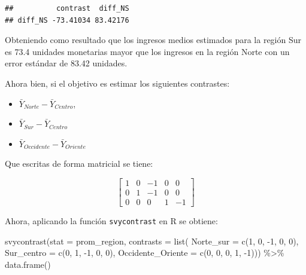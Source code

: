 \documentclass[
  12pt,
]{book}
\newenvironment{Shaded}{\begin{snugshade}}{\end{snugshade}}
\newcommand{\AttributeTok}[1]{\textcolor[rgb]{0.77,0.63,0.00}{#1}}
\newcommand{\DecValTok}[1]{\textcolor[rgb]{0.00,0.00,0.81}{#1}}
\newcommand{\FunctionTok}[1]{\textcolor[rgb]{0.00,0.00,0.00}{#1}}
\newcommand{\NormalTok}[1]{#1}
\newcommand{\SpecialCharTok}[1]{\textcolor[rgb]{0.00,0.00,0.00}{#1}}
\providecommand{\tightlist}{%
  \setlength{\itemsep}{0pt}\setlength{\parskip}{0pt}}
\begin{document}
\begin{verbatim}
##          contrast  diff_NS
## diff_NS -73.41034 83.42176
\end{verbatim}

Obteniendo como resultado que los ingresos medios estimados para la región Sur es 73.4 unidades monetarias mayor que los ingresos en la región Norte con un error estándar de 83.42 unidades.

Ahora bien, si el objetivo es estimar los siguientes contrastes:

\begin{itemize}
\tightlist
\item
  \(\bar{Y}_{Norte} - \bar{Y}_{Centro}\),
\item
  \(\bar{Y}_{Sur}-\bar{Y}_{Centro}\)\\
\item
  \(\bar{Y}_{Occidente}-\bar{Y}_{Oriente}\)
\end{itemize}

Que escritas de forma matricial se tiene:

\[
\left[\begin{array}{ccccc}
1 & 0 & -1 & 0 & 0\\
0 & 1 & -1 & 0 & 0\\
0 & 0 & 0 & 1 & -1
\end{array}\right]
\]

Ahora, aplicando la función \texttt{svycontrast} en R se obtiene:

\begin{Shaded}
\begin{Highlighting}[]
\FunctionTok{svycontrast}\NormalTok{(}\AttributeTok{stat =}\NormalTok{ prom\_region, }
            \AttributeTok{contrasts =} \FunctionTok{list}\NormalTok{(}
                             \AttributeTok{Norte\_sur =} \FunctionTok{c}\NormalTok{(}\DecValTok{1}\NormalTok{, }\DecValTok{0}\NormalTok{, }\SpecialCharTok{{-}}\DecValTok{1}\NormalTok{, }\DecValTok{0}\NormalTok{, }\DecValTok{0}\NormalTok{),}
                             \AttributeTok{Sur\_centro =} \FunctionTok{c}\NormalTok{(}\DecValTok{0}\NormalTok{, }\DecValTok{1}\NormalTok{, }\SpecialCharTok{{-}}\DecValTok{1}\NormalTok{, }\DecValTok{0}\NormalTok{, }\DecValTok{0}\NormalTok{),}
                             \AttributeTok{Occidente\_Oriente =} \FunctionTok{c}\NormalTok{(}\DecValTok{0}\NormalTok{, }\DecValTok{0}\NormalTok{, }\DecValTok{0}\NormalTok{, }\DecValTok{1}\NormalTok{, }\SpecialCharTok{{-}}\DecValTok{1}\NormalTok{))) }\SpecialCharTok{\%\textgreater{}\%}                               \FunctionTok{data.frame}\NormalTok{()}
\end{Highlighting}
\end{Shaded}
\end{document}
